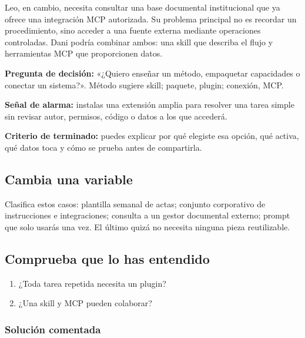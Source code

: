 \documentclass[10pt,a4paper,openany]{book}
\providecommand{\tightlist}{\setlength{\itemsep}{0.18em}\setlength{\parskip}{0pt}}
\begin{document}
Leo, en cambio, necesita consultar una base documental institucional que
ya ofrece una integración MCP autorizada. Su problema principal no es
recordar un procedimiento, sino acceder a una fuente externa mediante
operaciones controladas. Dani podría combinar ambos: una skill que
describa el flujo y herramientas MCP que proporcionen datos.

\textbf{Pregunta de decisión:} «¿Quiero enseñar un método, empaquetar
capacidades o conectar un sistema?». Método sugiere skill; paquete,
plugin; conexión, MCP.

\begin{warningbox}

\textbf{Señal de alarma:} instalas una extensión amplia para resolver
una tarea simple sin revisar autor, permisos, código o datos a los que
accederá.

\end{warningbox}

\begin{successbox}

\textbf{Criterio de terminado:} puedes explicar por qué elegiste esa
opción, qué activa, qué datos toca y cómo se prueba antes de
compartirla.

\end{successbox}

\subsection{Cambia una variable}\label{cambia-una-variable-16}

Clasifica estos casos: plantilla semanal de actas; conjunto corporativo
de instrucciones e integraciones; consulta a un gestor documental
externo; prompt que solo usarás una vez. El último quizá no necesita
ninguna pieza reutilizable.

\subsection{Comprueba que lo has
entendido}\label{comprueba-que-lo-has-entendido-16}

\begin{enumerate}
\def\labelenumi{\arabic{enumi}.}
\tightlist
\item
  ¿Toda tarea repetida necesita un plugin?
\item
  ¿Una skill y MCP pueden colaborar?
\end{enumerate}

\subsubsection{Solución comentada}\label{soluciuxf3n-comentada-18}
\end{document}
